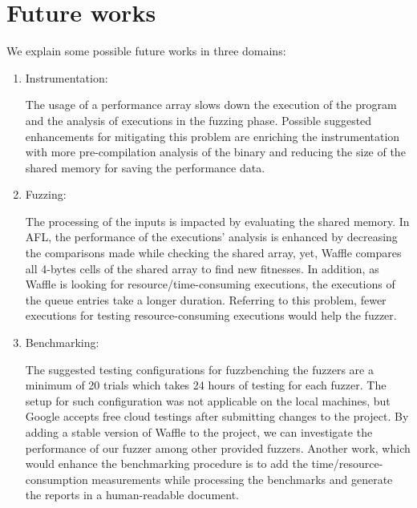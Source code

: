 \section{Future works}
\label{sec:future-work}

We explain some possible future works in three domains:

\begin{enumerate}
    \item Instrumentation:

        The usage of a performance array slows down the execution of the program and the analysis of executions in the fuzzing phase. Possible suggested enhancements for mitigating this problem are enriching the instrumentation with more pre-compilation analysis of the binary and reducing the size of the shared memory for saving the performance data.
        
    \item Fuzzing:
    
        The processing of the inputs is impacted by evaluating the shared memory. In AFL, the performance of the executions' analysis is enhanced by decreasing the comparisons made while checking the shared array, yet, Waffle compares all 4-bytes cells of the shared array to find new fitnesses. In addition, as Waffle is looking for resource/time-consuming executions, the executions of the queue entries take a longer duration. Referring to this problem, fewer executions for testing resource-consuming executions would help the fuzzer. 


    \item Benchmarking:
        
        The suggested testing configurations for fuzzbenching the fuzzers are a minimum of 20 trials which takes 24 hours of testing for each fuzzer. The setup for such configuration was not applicable on the local machines, but Google accepts free cloud testings after submitting changes to the project. By adding a stable version of Waffle to the project, we can investigate the performance of our fuzzer among other provided fuzzers. Another work, which would enhance the benchmarking procedure is to add the time/resource-consumption measurements while processing the benchmarks and generate the reports in a human-readable document.
\end{enumerate}